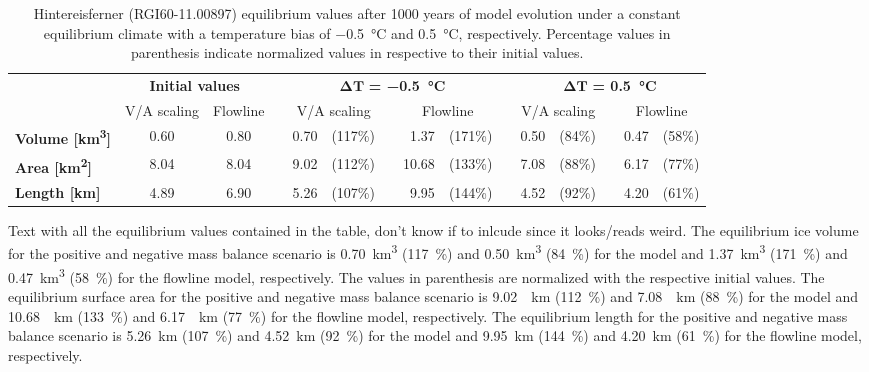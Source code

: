 \begin{sidewaystable}[htp]
  \centering
  \caption{Hintereisferner (RGI60-11.00897) equilibrium values after 1000 years of model evolution under a constant equilibrium climate with a temperature bias of \SI{-0.5}{\celsius} and \SI{+0.5}{\celsius}, respectively. Percentage values in parenthesis indicate normalized values in respective to their initial values.}
  \label{tab:hintereisferner_equilibrium_values}
  \begin{tabular}{@{}lcccrlcrlcrlcrl@{}}
    \toprule
    {} & \multicolumn{2}{c}{\textbf{Initial values}} & \phantom{asdf} & \multicolumn{5}{c}{$\bm{\Delta T}$\textbf{ = \SI{-0.5}{\celsius}}} & \phantom{a} & \multicolumn{5}{c}{$\bm{\Delta T}$\textbf{ = \SI{+0.5}{\celsius}}} \\
    \cmidrule{2-3} \cmidrule{5-9} \cmidrule{11-15}
    {} & V/A scaling & Flowline & \phantom {} & \multicolumn{2}{c}{V/A scaling} & \phantom {} & \multicolumn{2}{c}{Flowline} & \phantom{a} & \multicolumn{2}{c}{V/A scaling} & \phantom {} & \multicolumn{2}{c}{Flowline} \\
    \midrule
    \textbf{Volume [\si{\cubic\kilo\meter}]} & 0.60 & 0.80 & &  0.70 & (117\%) & \phantom {} &  1.37 & (171\%) & \phantom{a} &  0.50 & (84\%) & \phantom {} &  0.47 & (58\%) \\
    \textbf{Area [\si{\square\kilo\meter}]} & 8.04 & 8.04 & &  9.02 & (112\%) & \phantom {} &  10.68 & (133\%) & \phantom{a} &  7.08 & (88\%) & \phantom {} &  6.17 & (77\%) \\
    \textbf{Length [\si{\kilo\meter}]} & 4.89 & 6.90 & & 5.26 & (107\%) & \phantom {} &  9.95 & (144\%) & \phantom{a} &  4.52 & (92\%) & \phantom {} &  4.20 & (61\%) \\
    \bottomrule
  \end{tabular}
\end{sidewaystable}

Text with all the equilibrium values contained in the table, don't know if to inlcude since it looks/reads weird.
The equilibrium ice volume for the positive and negative mass balance scenario is \SI{0.70}{\cubic\kilo\meter} (\SI{117}{\percent}) and \SI{0.50}{\cubic\kilo\meter} (\SI{84}{\percent}) for the \vas{} model and \SI{1.37}{\cubic\kilo\meter} (\SI{171}{\percent}) and \SI{0.47}{\cubic\kilo\meter} (\SI{58}{\percent}) for the flowline model, respectively. The values in parenthesis are normalized with the respective initial values. The equilibrium surface area for the positive and negative mass balance scenario is \SI{9.02}{\squared\kilo\meter} (\SI{112}{\percent}) and \SI{7.08}{\squared\kilo\meter} (\SI{88}{\percent}) for the \vas{} model and \SI{10.68}{\squared\kilo\meter} (\SI{133}{\percent}) and \SI{6.17}{\squared\kilo\meter} (\SI{77}{\percent}) for the flowline model, respectively. The equilibrium length for the positive and negative mass balance scenario is \SI{5.26}{\kilo\meter} (\SI{107}{\percent}) and \SI{4.52}{\kilo\meter} (\SI{92}{\percent}) for the \vas{} model and \SI{9.95}{\kilo\meter} (\SI{144}{\percent}) and \SI{4.20}{\kilo\meter} (\SI{61}{\percent}) for the flowline model, respectively.

